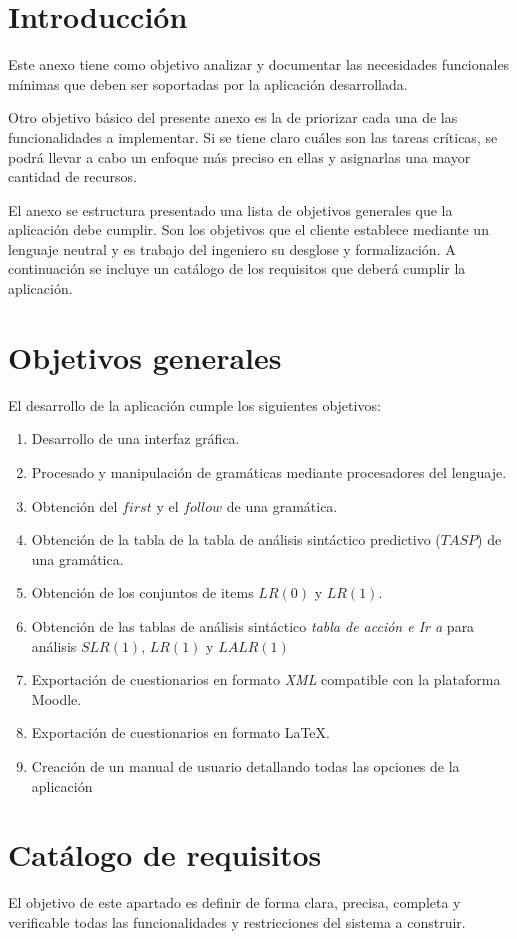 
\section{Introducción}
Este anexo tiene como objetivo analizar y documentar las necesidades funcionales mínimas que deben ser soportadas por la aplicación desarrollada. 

Otro objetivo básico del presente anexo es la de priorizar cada una de las funcionalidades a implementar. Si se tiene claro cuáles son las tareas críticas, se podrá llevar a cabo un enfoque más preciso en ellas y asignarlas una mayor cantidad de recursos.

El anexo se estructura presentado una lista de objetivos generales que la aplicación debe cumplir. Son los objetivos que el cliente establece mediante un lenguaje neutral y es trabajo del ingeniero su desglose y formalización. A continuación se incluye un catálogo de los requisitos que deberá cumplir la aplicación.

\section{Objetivos generales}
El desarrollo de la aplicación cumple los siguientes objetivos:
\begin{enumerate}
	\item Desarrollo de una interfaz gráfica.
	\item Procesado y manipulación de gramáticas mediante procesadores del lenguaje.
	\item Obtención del $first$ y el $follow$ de una gramática.
	\item Obtención de la tabla de la tabla de análisis sintáctico predictivo ($TASP$) de una gramática.
	\item Obtención de los conjuntos de items $LR(0)$ y  $LR(1)$.
	\item Obtención de las tablas de análisis sintáctico \textit{tabla de acción e Ir a} para análisis $SLR(1)$, $LR(1)$ y $LALR(1)$
	\item Exportación de cuestionarios en formato \textit{XML} compatible con la plataforma Moodle.
	\item Exportación de cuestionarios en formato \LaTeX{}.
	\item Creación de un manual de usuario detallando todas las opciones de la aplicación
\end{enumerate}

\section{Catálogo de requisitos}
El objetivo de este apartado es definir de forma clara, precisa, completa y verificable todas las funcionalidades y restricciones del sistema a construir.

